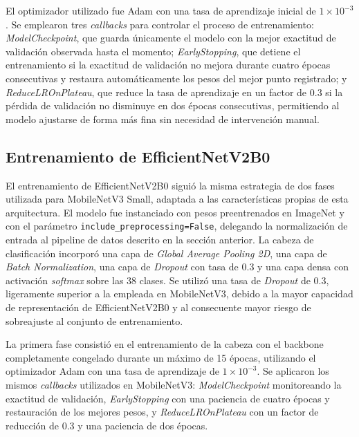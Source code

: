 El optimizador utilizado fue Adam con una tasa de aprendizaje inicial de $1 \times 10^{-3}$. Se emplearon tres \textit{callbacks}
para controlar el proceso de entrenamiento: \textit{ModelCheckpoint}, que guarda únicamente el modelo con la mejor exactitud de
validación observada hasta el momento; \textit{EarlyStopping}, que detiene el entrenamiento si la exactitud de validación no
mejora durante cuatro épocas consecutivas y restaura automáticamente los pesos del mejor punto registrado; y
\textit{ReduceLROnPlateau}, que reduce la tasa de aprendizaje en un factor de 0.3 si la pérdida de validación no disminuye en
dos épocas consecutivas, permitiendo al modelo ajustarse de forma más fina sin necesidad de intervención manual.


\subsection{Entrenamiento de EfficientNetV2B0}

El entrenamiento de EfficientNetV2B0 siguió la misma estrategia de dos fases utilizada para MobileNetV3 Small, adaptada a las
características propias de esta arquitectura. El modelo fue instanciado con pesos preentrenados en ImageNet y con el parámetro
\texttt{include\_preprocessing=False}, delegando la normalización de entrada al pipeline de datos descrito en la sección anterior.
La cabeza de clasificación incorporó una capa de \textit{Global Average Pooling 2D}, una capa de \textit{Batch Normalization},
una capa de \textit{Dropout} con tasa de 0.3 y una capa densa con activación \textit{softmax} sobre las 38 clases. Se utilizó
una tasa de \textit{Dropout} de 0.3, ligeramente superior a la empleada en MobileNetV3, debido a la mayor capacidad de
representación de EfficientNetV2B0 y al consecuente mayor riesgo de sobreajuste al conjunto de entrenamiento.

La primera fase consistió en el entrenamiento de la cabeza con el backbone completamente congelado durante un máximo de 15 épocas,
utilizando el optimizador Adam con una tasa de aprendizaje de $1 \times 10^{-3}$. Se aplicaron los mismos \textit{callbacks}
utilizados en MobileNetV3: \textit{ModelCheckpoint} monitoreando la exactitud de validación, \textit{EarlyStopping} con una
paciencia de cuatro épocas y restauración de los mejores pesos, y \textit{ReduceLROnPlateau} con un factor de reducción de 0.3
y una paciencia de dos épocas.


